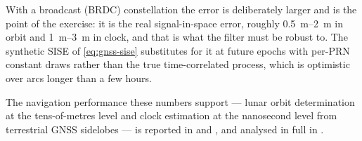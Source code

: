 With a broadcast (BRDC) constellation the error is deliberately larger and is
the point of the exercise: it is the real signal-in-space error, roughly
\SIrange{0.5}{2}{\meter} in orbit and \SIrange{1}{3}{\meter} in clock, and
that is what the filter must be robust to. The synthetic SISE of
\cref{eq:gnss-sise} substitutes for it at future epochs with per-PRN
constant draws rather than the true time-correlated process, which is
optimistic over arcs longer than a few hours.

The navigation performance these numbers support --- lunar orbit
determination at the tens-of-metres level and clock estimation at the
nanosecond level from terrestrial GNSS sidelobes --- is reported in
\citet{iiyama2024navi} and \citet{iiyama2026scud}, and analysed in full in
\citet[Ch.~6]{iiyama2026thesis}.
